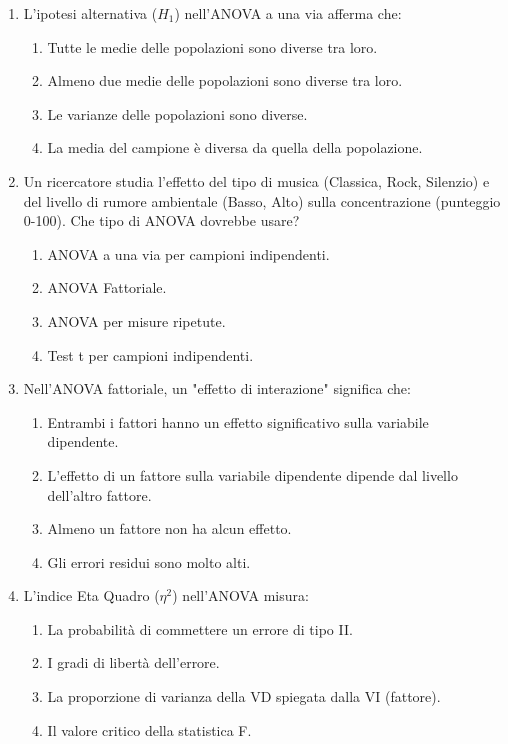 \documentclass[12pt, a4paper]{article}
\newcommand{\Halt}{H_1} %
\newcommand{\etasq}{\eta^2} %
\begin{document}
\begin{enumerate}
    \item L'ipotesi alternativa ($\Halt$) nell'ANOVA a una via afferma che:
    \begin{enumerate}
        \item Tutte le medie delle popolazioni sono diverse tra loro.
        \item Almeno due medie delle popolazioni sono diverse tra loro.
        \item Le varianze delle popolazioni sono diverse.
        \item La media del campione è diversa da quella della popolazione.
    \end{enumerate}

    \item Un ricercatore studia l'effetto del tipo di musica (Classica, Rock, Silenzio) e del livello di rumore ambientale (Basso, Alto) sulla concentrazione (punteggio 0-100). Che tipo di ANOVA dovrebbe usare?
    \begin{enumerate}
        \item ANOVA a una via per campioni indipendenti.
        \item ANOVA Fattoriale.
        \item ANOVA per misure ripetute.
        \item Test t per campioni indipendenti.
    \end{enumerate}

    \item Nell'ANOVA fattoriale, un "effetto di interazione" significa che:
    \begin{enumerate}
        \item Entrambi i fattori hanno un effetto significativo sulla variabile dipendente.
        \item L'effetto di un fattore sulla variabile dipendente dipende dal livello dell'altro fattore.
        \item Almeno un fattore non ha alcun effetto.
        \item Gli errori residui sono molto alti.
    \end{enumerate}

    \item L'indice Eta Quadro ($\etasq$) nell'ANOVA misura:
    \begin{enumerate}
        \item La probabilità di commettere un errore di tipo II.
        \item I gradi di libertà dell'errore.
        \item La proporzione di varianza della VD spiegata dalla VI (fattore).
        \item Il valore critico della statistica F.
    \end{enumerate}


\end{enumerate}
\end{document}
